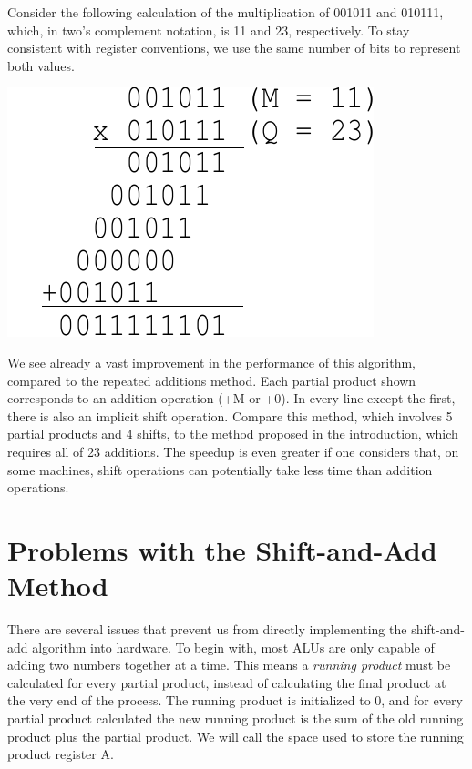 \documentclass{article}
\begin{document}
Consider the following calculation of the multiplication of 001011 and 010111, which, in two's complement notation, is 11 and 23, respectively.
To stay consistent with register conventions, we use the same number of bits to represent both values.

\includegraphics[scale=0.7]{saam3.pdf}

We see already a vast improvement in the performance of this algorithm, compared to the repeated additions method.
Each partial product shown corresponds to an addition operation (+M or +0).
In every line except the first, there is also an implicit shift operation.
Compare this method, which involves 5 partial products and 4 shifts, to the method proposed in the introduction, which requires all of 23 additions.
The speedup is even greater if one considers that, on some machines, shift operations can potentially take less time than addition operations.

\section{Problems with the Shift-and-Add Method}
There are several issues that prevent us from directly implementing the shift-and-add algorithm into hardware.
To begin with, most ALUs are only capable of adding two numbers together at a time.
This means a \emph{running product} must be calculated for every partial product, instead of calculating the final product at the very end of the process.
The running product is initialized to 0, and for every partial product calculated the new running product is the sum of the old running product plus the partial product.
We will call the space used to store the running product register A.
\end{document}
